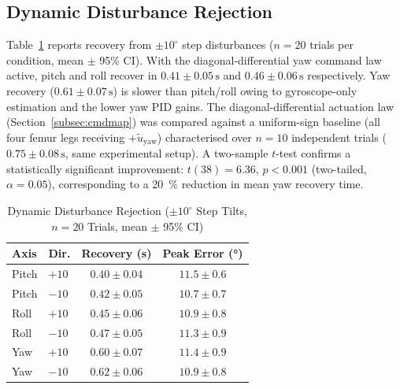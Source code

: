 \documentclass[journal]{IEEEtran}
\newcommand{\dg}{^{\circ}}
\begin{document}
\subsection{Dynamic Disturbance Rejection}
\label{subsec:dynamic}
Table~\ref{tab:dynamic} reports recovery from $\pm10\dg$ step
disturbances ($n=20$ trials per condition, mean $\pm$ 95\% CI).
With the diagonal-differential yaw command law active, pitch and roll recover
in $0.41 \pm 0.05\,\text{s}$ and $0.46 \pm 0.06\,\text{s}$
respectively.
Yaw recovery ($0.61 \pm 0.07\,\text{s}$) is slower than
pitch/roll owing to gyroscope-only estimation and the
lower yaw PID gains.
The diagonal-differential actuation law (Section~\ref{subsec:cmdmap})
was compared against a uniform-sign baseline (all four femur
legs receiving $+\tilde{u}_\text{yaw}$) characterised over
$n=10$ independent trials ($0.75 \pm 0.08\,\text{s}$, same
experimental setup).
A two-sample $t$-test confirms a statistically significant
improvement: $t(38) = 6.36$, $p < 0.001$ (two-tailed,
$\alpha = 0.05$), corresponding to a \SI{20}{\percent} reduction
in mean yaw recovery time.
\begin{table}[!t]
\caption{Dynamic Disturbance Rejection
         ($\pm10\dg$ Step Tilts, $n=20$ Trials, mean $\pm$ 95\% CI)}
\label{tab:dynamic}
\centering
\begin{tabular}{llcc}
\toprule
\textbf{Axis} & \textbf{Dir.} &
\textbf{Recovery (s)} & \textbf{Peak Error (\si{\degree})} \\
\midrule
Pitch & $+10$ & $0.40 \pm 0.04$ & $11.5 \pm 0.6$ \\
Pitch & $-10$ & $0.42 \pm 0.05$ & $10.7 \pm 0.7$ \\
Roll  & $+10$ & $0.45 \pm 0.06$ & $10.9 \pm 0.8$ \\
Roll  & $-10$ & $0.47 \pm 0.05$ & $11.3 \pm 0.9$ \\
Yaw   & $+10$ & $0.60 \pm 0.07$ & $11.4 \pm 0.9$ \\
Yaw   & $-10$ & $0.62 \pm 0.06$ & $10.9 \pm 0.8$ \\
\bottomrule
\end{tabular}
\end{table}
\end{document}
